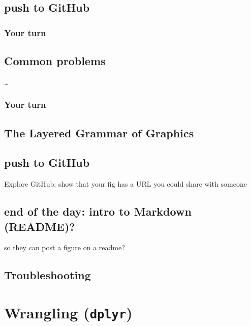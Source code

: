 \documentclass[]{book}
\theoremstyle{definition}
\theoremstyle{definition}
\theoremstyle{definition}
\theoremstyle{remark}
\begin{document}
\section{push to GitHub}\label{push-to-github}

\subsection{Your turn}\label{your-turn-5}

\section{Common problems}\label{common-problems}

\ldots{}

\subsection{Your turn}\label{your-turn-6}

\section{The Layered Grammar of
Graphics}\label{the-layered-grammar-of-graphics}

\section{push to GitHub}\label{push-to-github-1}

Explore GitHub; show that your fig has a URL you could share with
someone

\section{end of the day: intro to Markdown
(README)?}\label{end-of-the-day-intro-to-markdown-readme}

so they can post a figure on a readme?

\section{Troubleshooting}\label{troubleshooting-2}

\chapter{\texorpdfstring{Wrangling
(\texttt{dplyr})}{Wrangling (dplyr)}}\label{dplyr}
\end{document}

